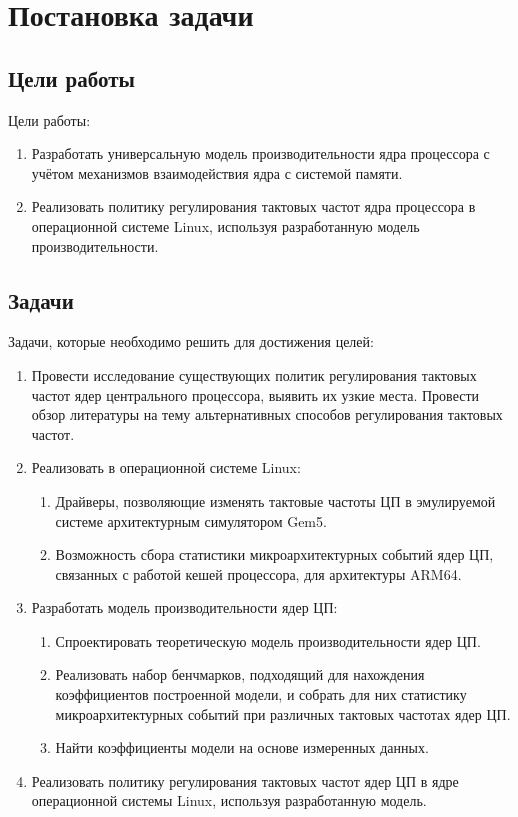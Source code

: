 \section{Постановка задачи}
\label{sec:Section1} 

\subsection{Цели работы}

    Цели работы:
    \begin{enumerate}
        \item Разработать универсальную модель производительности ядра процессора с учётом
        механизмов взаимодействия ядра с системой памяти.
        \item Реализовать политику регулирования тактовых частот ядра процессора в операционной
        системе Linux, используя разработанную модель производительности.
    \end{enumerate}

\subsection{Задачи}

    Задачи, которые необходимо решить для достижения целей:
    \begin{enumerate}
        \item Провести исследование существующих политик регулирования тактовых частот ядер центрального
        процессора, выявить их узкие места. Провести обзор литературы на тему альтернативных способов
        регулирования тактовых частот.
        \item Реализовать в операционной системе Linux:
        \begin{enumerate}
            \item Драйверы, позволяющие изменять тактовые частоты ЦП в эмулируемой системе
            архитектурным симулятором Gem5.
            \item Возможность сбора статистики микроархитектурных событий ядер ЦП, связанных с работой
            кешей процессора, для архитектуры ARM64.
        \end{enumerate}
        \item Разработать модель производительности ядер ЦП:
        \begin{enumerate}
            \item Спроектировать теоретическую модель производительности ядер ЦП.
            \item Реализовать набор бенчмарков, подходящий для нахождения коэффициентов
                построенной модели, и собрать для них статистику микроархитектурных событий при
                различных тактовых частотах ядер ЦП.
            \item Найти коэффициенты модели на основе измеренных данных.
        \end{enumerate}
        \item Реализовать политику регулирования тактовых частот ядер ЦП в ядре операционной системы
            Linux, используя разработанную модель.
    \end{enumerate}
\newpage
